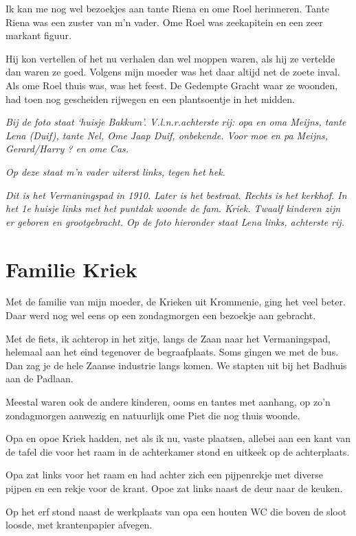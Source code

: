 \documentclass[10pt,twoside,openright]{memoir}
\begin{document}
Ik kan me nog wel bezoekjes aan tante Riena en ome Roel herinneren. Tante Riena was een zuster van m’n vader. Ome Roel was zeekapitein en een zeer markant figuur. 

Hij kon vertellen of het nu verhalen dan wel moppen waren, als hij ze vertelde dan waren ze goed. Volgens mijn moeder was het daar altijd net de zoete inval. Als ome Roel thuis was, was het feest. De Gedempte Gracht waar ze woonden, had toen nog gescheiden rijwegen en een plantsoentje in het midden. 

\emph{Bij de foto staat ‘huisje Bakkum’. V.l.n.r.achterste rij: opa en oma Meijns, tante Lena (Duif), tante Nel, Ome Jaap Duif, onbekende. Voor moe en pa Meijns, Gerard/Harry ? en ome Cas.
}

\emph{Op deze staat m’n vader uiterst links, tegen het hek.}

\emph{Dit is het Vermaningspad in 1910. Later is het bestraat. Rechts is het kerkhof. In het 1e huisje links met het puntdak woonde de fam. Kriek. Twaalf kinderen zijn er geboren en grootgebracht. Op de foto hieronder staat Lena links, achterste rij.}

\chapter{Familie Kriek} %
\label{cha:familie_kriek}

Met de familie van mijn moeder, de Krieken uit Krommenie, ging het veel beter. Daar werd nog wel eens op een zondagmorgen een bezoekje aan gebracht. 

Met de fiets, ik achterop in het zitje, langs de Zaan naar het Vermaningspad, helemaal aan het eind tegenover de begraafplaats. Soms gingen we met de bus. Dan zag je de hele Zaanse industrie langs komen. We stapten uit bij het Badhuis aan de Padlaan. 

Meestal waren ook de andere kinderen, ooms en tantes met aanhang, op zo’n zondagmorgen aanwezig en natuurlijk ome Piet die nog thuis woonde. 

Opa en opoe Kriek hadden, net als ik nu, vaste plaatsen, allebei aan een kant van de tafel die voor het raam in de achterkamer stond en uitkeek op de achterplaats. 

Opa zat links voor het raam en had achter zich een pijpenrekje met diverse pijpen en een rekje voor de krant. Opoe zat links naast de deur naar de keuken.

Op het erf stond naast de werkplaats van opa een houten WC die boven de sloot loosde, met krantenpapier afvegen. 
\end{document}
